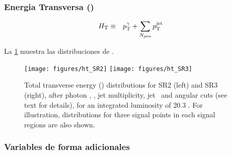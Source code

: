 \subsubsection{Energia Transversa (\HT)}
\label{sec:ht_obj}


\begin{eqnarray} \label{eq:htaddition}
H_{\mathrm{T}}  &\equiv& p_{\mathrm{T}}^{\gamma} + \sum_{N_{\rm jets}} p_{\mathrm{T}}^{\rm jet}
\end{eqnarray}

La {\fig} \ref{fig:HT_3SR} muestra las distribuciones de {\HT}.


\begin{figure}[th!]
  \centering
  \texttt{[image: figures/ht\_SR2]}
  \texttt{[image: figures/ht\_SR3]}
  \caption{Total transverse energy (\HT) distributions for SR2 (left) and SR3 (right), after photon \pt, \etmiss, jet multiplicity, jet \pt\ and angular cuts (see text for details), for an integrated luminosity of 20.3 \ifb.  For illustration,
    distributions for three signal points in each signal regions are also shown.}
  \label{fig:HT_3SR}
\end{figure}

\subsubsection{Variables de forma adicionales}\label{sec:shape_vars}

